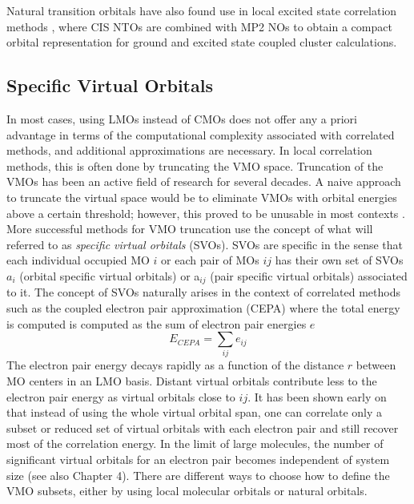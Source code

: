 Natural transition orbitals have also found use in local excited  state correlation methods \cite{Bau2017,Hof2017}, where CIS NTOs are combined with MP2 NOs to obtain a compact orbital representation for ground and excited state coupled cluster calculations.







\subsection{Specific Virtual Orbitals}

In most cases, using LMOs instead of CMOs does not offer any a priori advantage in terms of the computational complexity associated with correlated methods, and additional approximations are necessary. In local correlation methods, this is often done by truncating the VMO space. Truncation of the VMOs has been an active field of research for several decades. A naive approach to truncate the virtual space would be to eliminate VMOs with orbital energies above a certain threshold; however, this proved to be unusable in most contexts \cite{Sen2011}. More successful methods for VMO truncation use the concept of what will referred to as \emph{specific virtual orbitals} (SVOs). SVOs are specific in the sense that each individual occupied MO $i$ or each pair of MOs $ij$ has their own set of SVOs $a_i$ (orbital specific virtual orbitals) or a$_{ij}$ (pair specific virtual orbitals) associated to it.
The concept of SVOs naturally arises in the context of correlated methods such as the coupled electron pair approximation (CEPA) where the total energy is computed is computed as the sum of electron pair energies $e$
\begin{equation}
E_{CEPA} = \sum_{ij} e_{ij}
\end{equation}
The electron pair energy decays rapidly as a function of the distance $r$ between MO centers in an LMO basis. Distant virtual orbitals contribute less to the electron pair energy as virtual orbitals close to ${ij}$. It has been shown early on that instead of using the whole virtual orbital span, one can correlate only a subset or reduced set of virtual orbitals with each electron pair \cite{Sae1985,Edm1965,Mey1971,Mey1973}
and still recover most of the correlation energy. In the limit of large molecules, the number of significant virtual orbitals for an electron pair becomes independent of system size \cite{Kra2012} (see also Chapter 4). There are different ways to choose how to define the VMO subsets, either by using local molecular orbitals or natural orbitals.


